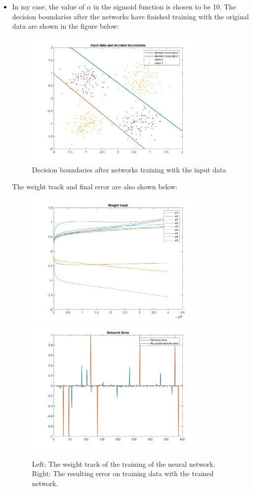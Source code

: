 \documentclass[a4paper]{article}
\begin{document}
\begin{spacing}{2.0}
\begin{itemize}
\item In my case, the value of $\alpha$ in the sigmoid function is chosen to be 10. The decision boundaries after the networks have finished training with the original data are shown in the figure below:
\begin{figure}[H]
\centering
\includegraphics[width = 3.5in]{inputDB.jpg}
\caption{Decision boundaries after networks training with the input data}
\label{inputDB}
\end{figure}

The weight track and final error are also shown below:
\begin{figure}[H]
\centering
\includegraphics[width = 3.5in]{WT.jpg}
\includegraphics[width = 3.5in]{error.jpg}
\caption{Left: The weight track of the training of the neural network. Right: The resulting error on training data with the trained network.}
\label{WTerror}
\end{figure}


\end{itemize}
\end{spacing}
\end{document}
